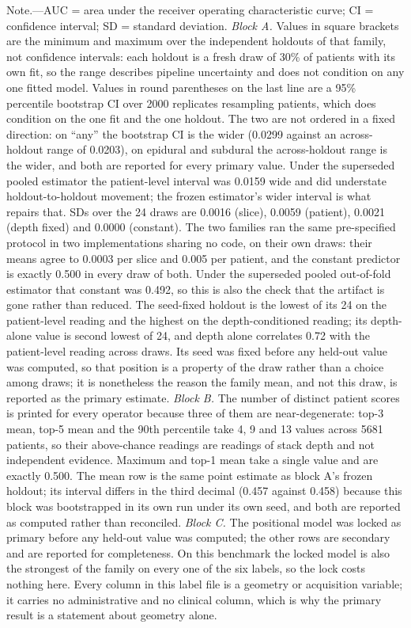 \documentclass[11pt,letterpaper]{article}
\begin{document}
\begin{singlespace}
\vspace{0.4em}
{\scriptsize
Note.---AUC = area under the receiver operating characteristic curve; CI =
confidence interval; SD = standard deviation. \emph{Block A.} Values in square
brackets are the minimum and maximum over the independent holdouts of that
family, not confidence intervals: each holdout is a fresh draw of 30\% of
patients with its own fit, so the range describes pipeline uncertainty and does
not condition on any one fitted model. Values in round parentheses on the last
line are a 95\% percentile bootstrap CI over 2000 replicates resampling patients,
which does condition on the one fit and the one holdout. The two are not ordered
in a fixed direction: on ``any'' the bootstrap CI is the wider (0.0299 against an
across-holdout range of 0.0203), on epidural and subdural the across-holdout
range is the wider, and both are reported for every primary value. Under the
superseded pooled estimator the patient-level interval was 0.0159 wide and did
understate holdout-to-holdout movement; the frozen estimator's wider interval is
what repairs that. SDs over the 24 draws are 0.0016 (slice), 0.0059 (patient),
0.0021 (depth fixed) and 0.0000 (constant). The two families ran the same
pre-specified protocol in two implementations sharing no code, on their own
draws:
their means agree to 0.0003 per slice and 0.005 per patient, and the constant
predictor is exactly 0.500 in every draw of both. Under the superseded pooled
out-of-fold estimator that constant was 0.492, so this is also the check that the
artifact is gone rather than reduced. The seed-fixed holdout is the lowest of
its 24 on the patient-level reading and the highest on the depth-conditioned
reading; its depth-alone value is second lowest of 24, and depth alone correlates
0.72 with the patient-level reading across draws. Its seed was fixed before any
held-out value was computed, so that position is a property of the draw rather
than a choice among draws; it is nonetheless the reason the family mean, and not
this draw, is reported as the primary estimate.
\emph{Block B.} The number of distinct patient scores is printed for every
operator because three of them are near-degenerate: top-3 mean, top-5 mean and
the 90th percentile take 4, 9 and 13 values across \num{5681} patients, so their
above-chance readings are readings of stack depth and not independent evidence.
Maximum and top-1 mean take a single value and are exactly 0.500. The mean row is
the same point estimate as block A's frozen holdout; its interval differs in the
third decimal (0.457 against 0.458) because this block was bootstrapped in its
own run under its own seed, and both are reported as computed rather than
reconciled.
\emph{Block C.} The positional model was locked as primary before any held-out
value was computed; the other rows are secondary and are reported for
completeness. On this benchmark the locked model is also the strongest of the
family on every one of the six labels, so the lock costs nothing here. Every
column in this label file is a geometry or acquisition variable; it carries no
administrative and no clinical column, which is why the primary result is a
statement about geometry alone.

}
\end{singlespace}
\end{document}

